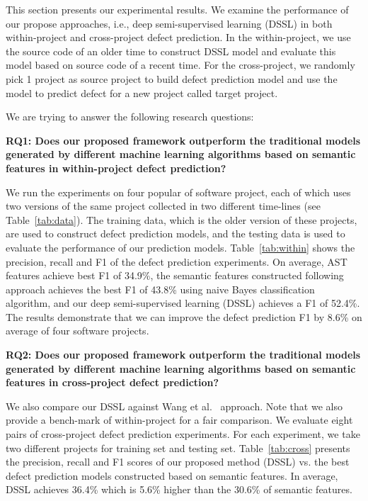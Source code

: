 

This section presents our experimental results. We examine the performance of our propose approaches, i.e., deep semi-supervised learning (DSSL) in both within-project and cross-project defect prediction. In the within-project, we use the source code of an older time to construct DSSL model and evaluate this model based on source code of a recent time. For the cross-project, we randomly pick 1 project as source project to build defect prediction model and use the model to predict defect for a new project called target project.

We are trying to answer the following research questions: 

\textbf{RQ1: Does our proposed framework outperform the traditional models generated by different machine learning algorithms based on semantic features in within-project defect prediction?}

We run the experiments on four popular of software project, each of which uses two versions of the same project collected in two different time-lines (see Table~\ref{tab:data}). The training data, which is the older version of these projects, are used to construct defect prediction models, and the testing data is used to evaluate the performance of our prediction models. Table~\ref{tab:within} shows the precision, recall and F1 of the defect prediction experiments. On average, AST features achieve best F1 of 34.9\%, the semantic features constructed following~\cite{wang2016automatically} approach achieves the best F1 of 43.8\% using naive Bayes classification algorithm, and our deep semi-supervised learning (DSSL) achieves a F1 of 52.4\%. The results demonstrate that we can improve the defect prediction F1 by 8.6\% on average of four software projects. 


\textbf{RQ2: Does our proposed framework outperform the traditional models generated by different machine learning algorithms based on semantic features in cross-project defect prediction?}

We also compare our DSSL against Wang et al.~\cite{wang2016automatically} approach. Note that we also provide a bench-mark of within-project for a fair comparison. We evaluate eight pairs of cross-project defect prediction experiments. For each experiment, we take two different projects for training set and testing set. Table~\ref{tab:cross} presents the precision, recall and F1 scores of our proposed method (DSSL) vs. the best defect prediction models constructed based on semantic features. In average, DSSL achieves 36.4\% which is 5.6\% higher than the 30.6\% of semantic features. 

